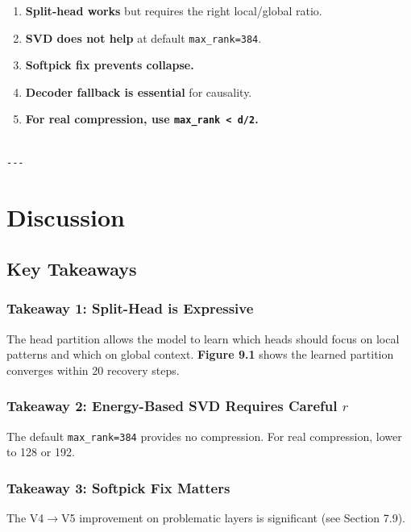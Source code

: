 \begin{enumerate}
\item \textbf{Split-head works} but requires the right local/global ratio.
\item \textbf{SVD does not help} at default \texttt{max\_rank=384}.
\item \textbf{Softpick fix prevents collapse.}
\item \textbf{Decoder fallback is essential} for causality.
\item \textbf{For real compression, use \texttt{max\_rank \textless{} d/2}.}
\end{enumerate}
\begin{lstlisting}

---
\end{lstlisting}

\section{Discussion}

\subsection{Key Takeaways}

\subsubsection{Takeaway 1: Split-Head is Expressive}

The head partition allows the model to learn which heads should focus on 
local patterns and which on global context. \textbf{Figure 9.1} shows the 
learned partition converges within 20 recovery steps.

\subsubsection{Takeaway 2: Energy-Based SVD Requires Careful $r$}

The default \texttt{max\_rank=384} provides no compression. For real compression, 
lower to 128 or 192.

\subsubsection{Takeaway 3: Softpick Fix Matters}

The V4$\to$V5 improvement on problematic layers is significant (see Section 7.9).

